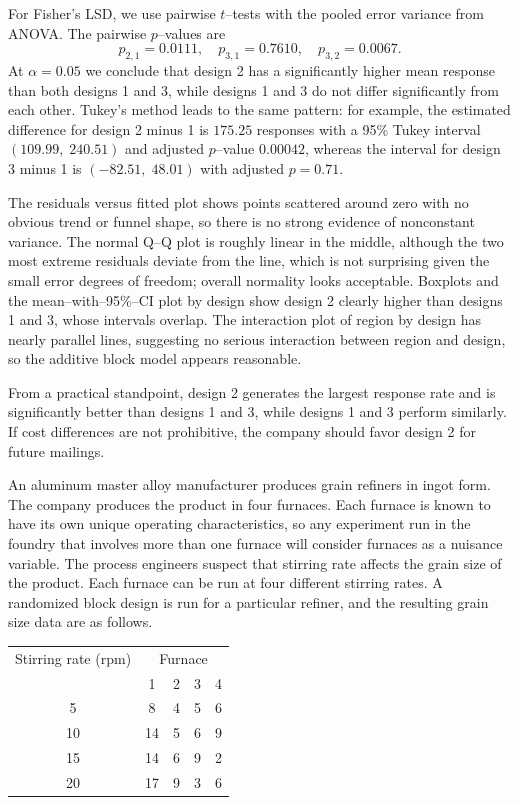 \documentclass[answers,12pt,addpoints]{exam}
\begin{document}
\begin{questions}
\begin{solution}
For Fisher’s LSD, we use pairwise $t$–tests with the pooled error variance from ANOVA. The pairwise $p$–values are
\[
p_{2,1} = 0.0111,\quad
p_{3,1} = 0.7610,\quad
p_{3,2} = 0.0067.
\]
At $\alpha = 0.05$ we conclude that design 2 has a significantly higher mean response than both designs 1 and 3, while designs 1 and 3 do not differ significantly from each other. Tukey’s method leads to the same pattern: for example, the estimated difference for design 2 minus 1 is $175.25$ responses with a 95\% Tukey interval $(109.99,\;240.51)$ and adjusted $p$–value $0.00042$, whereas the interval for design 3 minus 1 is $(-82.51,\;48.01)$ with adjusted $p=0.71$.

The residuals versus fitted plot shows points scattered around zero with no obvious trend or funnel shape, so there is no strong evidence of nonconstant variance. The normal Q–Q plot is roughly linear in the middle, although the two most extreme residuals deviate from the line, which is not surprising given the small error degrees of freedom; overall normality looks acceptable. Boxplots and the mean–with–95\%–CI plot by design show design 2 clearly higher than designs 1 and 3, whose intervals overlap. The interaction plot of region by design has nearly parallel lines, suggesting no serious interaction between region and design, so the additive block model appears reasonable.

From a practical standpoint, design 2 generates the largest response rate and is significantly better than designs 1 and 3, while designs 1 and 3 perform similarly. If cost differences are not prohibitive, the company should favor design 2 for future mailings.
\end{solution}


 An aluminum master alloy manufacturer produces grain refiners in ingot form. The company produces the product in four furnaces. Each furnace is known to have its own unique operating characteristics, so any experiment run in the foundry that involves more than one furnace will consider furnaces as a nuisance variable. The process engineers suspect that stirring rate affects the grain size of the product. Each furnace can be run at four different stirring rates. A randomized block design is run for a particular refiner, and the resulting grain size data are as follows.

\begin{center}
\begin{tabular}{c|cccc}
\hline
Stirring rate (rpm) & \multicolumn{4}{c}{Furnace} \\
 & 1 & 2 & 3 & 4 \\
\hline
5  & 8  & 4 & 5 & 6 \\
10 & 14 & 5 & 6 & 9 \\
15 & 14  & 6 & 9 & 2 \\
20 & 17 & 9 & 3 & 6 \\
\hline
\end{tabular}
\end{center}


\end{questions}
\end{document}
